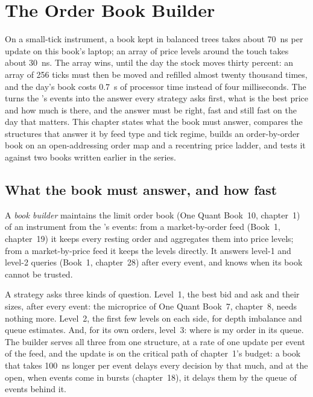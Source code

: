 \chapter{The Order Book Builder}\label{ch:ll:the-order-book-builder}

On a small-tick instrument, a book kept in balanced trees takes about \qty{70}{\nano\second} per update on this book's
laptop; an array of price levels around the touch takes about \qty{30}{\nano\second}. The array wins, until the day the
stock moves thirty percent: an array of 256 ticks must then be moved and refilled almost twenty thousand times, and the
day's book costs \qty{0.7}{\second} of processor time instead of four milliseconds. The  turns the 's events into the answer every strategy asks first, what is the best price and how much is there, and the answer
must be right, fast and still fast on the day that matters. This chapter states what the book must answer, compares the
structures that answer it by feed type and tick regime, builds an order-by-order book on an open-addressing order map and a
recentring price ladder, and tests it against two books written earlier in the series.

\section{What the book must answer, and how fast}

\begin{definition}\label{def:ll:the-order-book-builder:builder}
A \emph{book builder} maintains the limit order book (One Quant Book~10, chapter~1) of an instrument from
the 's events: from a market-by-order feed (Book~1, chapter~19) it keeps every resting order and aggregates
them into price levels; from a market-by-price feed it keeps the levels directly. It answers level-1 and level-2 queries
(Book~1, chapter~28) after every event, and knows when its book cannot be trusted.
\end{definition}

A strategy asks three kinds of question. Level~1, the best bid and ask and their sizes, after every event: the microprice of
One Quant Book~7, chapter~8, needs nothing more. Level~2, the first few levels on each side, for depth imbalance and queue
estimates. And, for its own orders, level~3: where is my order in its queue. The builder serves all three from one structure,
at a rate of one update per event of the feed, and the update is on the critical path of chapter~1's budget: a book that
takes \qty{100}{\nano\second} longer per event delays every decision by that much, and at the open, when events come in
bursts (chapter~18), it delays them by the queue of events behind it.

